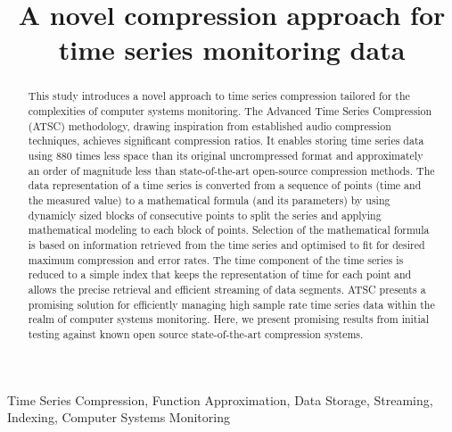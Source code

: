 \documentclass[conference]{IEEEtran}
\begin{document}
\title{A novel compression approach for time series monitoring data\\}

\author{
\and
{}
\and
{}
}

\maketitle

\begin{abstract}
    This study introduces a novel approach to time series compression tailored for the complexities of computer systems monitoring.
    The Advanced Time Series Compression (ATSC) methodology, drawing inspiration from established audio compression techniques, achieves significant compression ratios. It enables storing time series data using 880 times less space than its original uncrompressed format and approximately an order of magnitude less than state-of-the-art open-source compression methods.
    The data representation of a time series is converted from a sequence of points (time and the measured value) to a mathematical formula (and its parameters) by using dynamicly sized blocks of consecutive points to split the series and applying mathematical modeling to each block of points.
    Selection of the mathematical formula is based on information retrieved from the time series and optimised to fit for desired maximum compression and error rates.
    The time component of the time series is reduced to a simple index that keeps the representation of time for each point and allows the precise retrieval and efficient streaming of data segments. 
    ATSC presents a promising solution for efficiently managing high sample rate time series data within the realm of computer systems monitoring.
    Here, we present promising results from initial testing against known open source state-of-the-art compression systems. 
\end{abstract}
\vspace{5pt}
\begin{IEEEkeywords}
Time Series Compression, Function Approximation, Data Storage, Streaming, Indexing, Computer Systems Monitoring
\end{IEEEkeywords}
\end{document}
